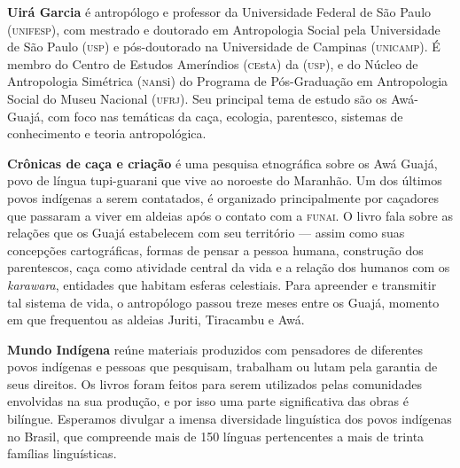 \textbf{Uirá Garcia} é antropólogo e professor da Universidade Federal de São Paulo \textsc{(unifesp)}, com mestrado e doutorado em Antropologia Social pela Universidade de São Paulo \textsc{(usp)} e pós-doutorado na Universidade de Campinas \textsc{(unicamp)}. 
É membro do Centro de Estudos Ameríndios (\textsc{ce}st\textsc{a}) da \textsc{(usp)}, e do Núcleo de Antropologia Simétrica (\textsc{na}n\textsc{s}i) do Programa de Pós-Graduação em Antropologia Social do Museu Nacional (\textsc{ufrj}). Seu principal tema de estudo são os Awá-Guajá, com foco nas temáticas da caça, ecologia, parentesco, sistemas de conhecimento e teoria antropológica.
	
\textbf{Crônicas de caça e criação} é uma pesquisa etnográfica sobre os Awá Guajá, povo de língua tupi-guarani que vive ao noroeste do Maranhão. Um dos últimos povos indígenas a serem contatados, é organizado principalmente por caçadores que passaram a viver em aldeias após o contato com a \textsc{funai}. O livro fala sobre as relações que os Guajá estabelecem com seu território --- assim como suas concepções cartográficas, formas de pensar a pessoa humana, construção dos parentescos, caça como atividade central da vida e a relação dos humanos com os \emph{karawara}, entidades que habitam esferas celestiais. Para apreender e transmitir tal sistema de vida, o antropólogo passou treze meses entre os Guajá, momento em que frequentou as aldeias Juriti, Tiracambu e Awá.

\textbf{Mundo Indígena} reúne materiais produzidos com pensadores de diferentes povos indígenas e pessoas que pesquisam, trabalham ou lutam pela garantia de seus direitos. Os livros foram feitos para serem utilizados pelas comunidades envolvidas na sua produção, e por isso uma parte significativa das obras é bilíngue. Esperamos divulgar a imensa diversidade linguística dos povos indígenas no Brasil, que compreende mais de 150 línguas pertencentes a mais de trinta famílias linguísticas.



